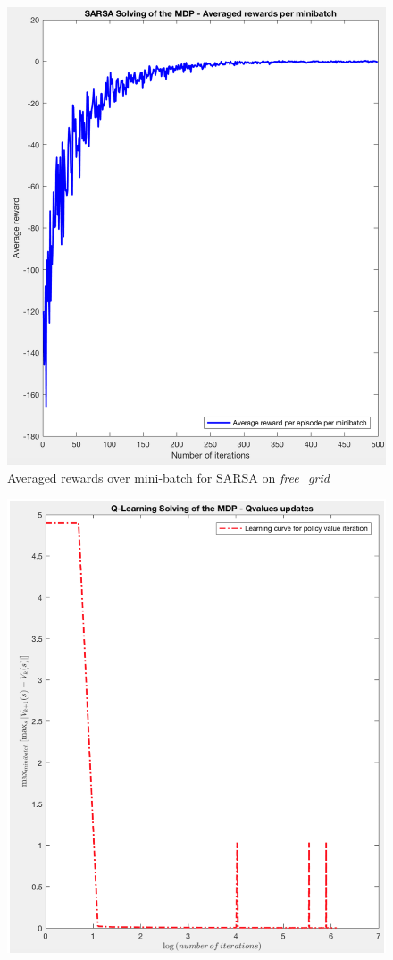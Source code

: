 \documentclass[a4paper]{report}
\begin{document}
{{{\begin{figure}[ht!]
\begin{minipage}{0.4\linewidth}
						\includegraphics[width=0.9\linewidth]{sarsa_average_rewards_freegrid}
						\caption{Averaged rewards over mini-batch for SARSA on \emph{free\_grid}}
					\end{minipage}
				\end{figure}
				\begin{figure}[h!]
					\begin{minipage}{0.4\linewidth}
						\includegraphics[width=0.9\linewidth]{bargrid_ql_learning_curve}

\end{minipage}
\end{figure}}}}
\end{document}
